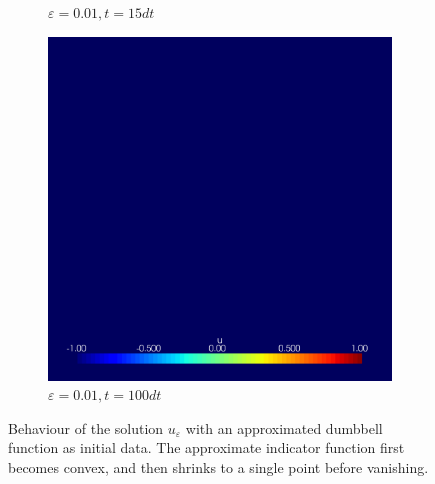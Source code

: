 \begin{figure}[h]
\begin{subfigure}[b]{0.3\linewidth}
		\caption{$ \varepsilon = 0.01, t = 15dt $}
	\end{subfigure}
	\hfill
	\begin{subfigure}[b]{0.3\linewidth}
		\includegraphics[width=\linewidth]{numerical_simulation/dumbel/eps_0.01000101.vtu}
		\caption{$ \varepsilon = 0.01, t =  100dt $}
	\end{subfigure}
	
	\caption{Behaviour of the solution $u_{ \varepsilon } $ with an 
	approximated dumbbell function as initial data. The approximate indicator 
	function first becomes convex, and then shrinks to a single point before 
	vanishing.}
	\label{numerical_simulation_dumbbell}
\end{figure}